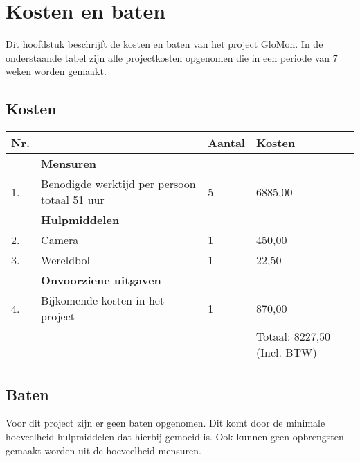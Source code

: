 \chapter{Kosten en baten} \label{cha:kostenenbaten}

Dit hoofdstuk beschrijft de kosten en baten van het project GloMon. In de onderstaande tabel zijn alle projectkosten opgenomen die in een periode van 7 weken worden gemaakt.

\section{Kosten} \label{subsec:kosten}

\begin{left}
    \begin{tabular}{ | l | l | l | l | }
    	\hline
    	Nr. &    & Aantal & Kosten \\ \hline
    		& \textbf{Mensuren} & & \\ \hline
    	1.	& Benodigde werktijd per persoon totaal 51 uur & 5 & 6885,00 \\ \hline
    		& \textbf{Hulpmiddelen} & & \\ \hline
    	2.	& Camera & 1 & 450,00 \\ \hline
    	3.	& Wereldbol & 1 & 22,50 \\ \hline
     		& \textbf{Onvoorziene uitgaven} & & \\ \hline
     	4.  & Bijkomende kosten in het project & 1 & 870,00 \\ \hline
     	&	& 	& Totaal: 8227,50 (Incl. BTW) \\ \hline
  	\end{tabular}
\end{left}

\section{Baten} \label{subsec:baten}

Voor dit project zijn er geen baten opgenomen. Dit komt door de minimale hoeveelheid hulpmiddelen dat hierbij gemoeid is. Ook kunnen geen opbrengsten gemaakt worden uit de hoeveelheid mensuren.